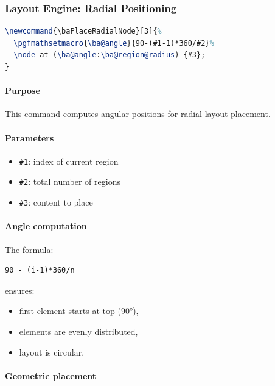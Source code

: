 \subsubsection{Layout Engine: Radial Positioning}

\begin{lstlisting}[language=LaTeX]
\newcommand{\baPlaceRadialNode}[3]{%
  \pgfmathsetmacro{\ba@angle}{90-(#1-1)*360/#2}%
  \node at (\ba@angle:\ba@region@radius) {#3};
}
\end{lstlisting}

\paragraph{Purpose}

This command computes angular positions for radial layout placement.

\paragraph{Parameters}

\begin{itemize}
\item \texttt{\#1}: index of current region
\item \texttt{\#2}: total number of regions
\item \texttt{\#3}: content to place
\end{itemize}

\paragraph{Angle computation}

The formula:

\begin{lstlisting}[language=LaTeX]
90 - (i-1)*360/n
\end{lstlisting}

ensures:

\begin{itemize}
\item first element starts at top (90°),
\item elements are evenly distributed,
\item layout is circular.
\end{itemize}

\paragraph{Geometric placement}

